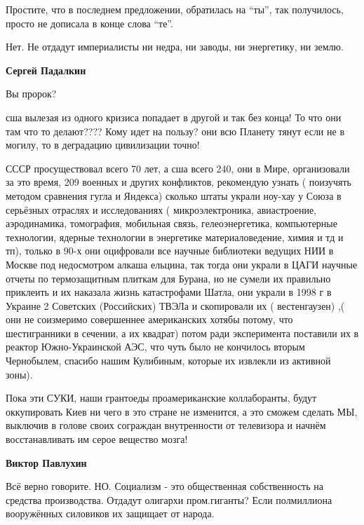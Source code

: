 \begin{itemize}
\begin{itemize}

Простите, что в последнем предложении, обратилась на \enquote{ты}, так
получилось, просто не дописала в конце слова \enquote{те}.

\end{itemize} %

Нет. Не отдадут империалисты ни недра, ни заводы, ни энергетику, ни землю.

\begin{itemize} %
\textbf{Сергей Падалкин} 

Вы пророк?

сша вылезая из одного кризиса попадает в другой и так без конца! То что они там
что то делают???? Кому идет на пользу? они всю Планету тянут если не в могилу,
то в деградацию цивилизации точно!

СССР просуществовал всего 70 лет, а сша всего 240, они в Мире, организовали за
это время, 209 военных и других конфликтов, рекомендую узнать ( поизучять
методом сравнения гугла и Яндекса) сколько штаты украли ноу-хау у Союза в
серьёзных отраслях и исследованиях ( микроэлектроника, авиастроение,
аэродинамика, томография, мобильная связь, гелеоэнергетика, компьютерные
технологии, ядерные технологии в энергетике материаловедение, химия и тд и тп),
только в 90-х они оцифровали все научные библиотеки ведущих НИИ в Москве под
недосмотром алкаша ельцина, так тогда они украли в ЦАГИ научные отчеты по
термозащитным плиткам для Бурана, но не сумели их правильно приклеить и их
наказала жизнь катастрофами Шатла, они украли в 1998 г в Украине 2 Советских
(Российских) ТВЭЛа и скопировали их ( вестенгаузен) ,( они не соизмеримо
совершеннее американских хотябы потому, что шестигранники в сечении, а их
квадрат) потом ради эксперимента поставили их в реактор Южно-Украинской АЭС,
что чуть было не кончилось вторым Чернобылем, спасибо нашим Кулибиным, которые
их извлекли из активной зоны).

Пока эти СУКИ, наши грантоеды проамериканские коллаборанты, будут оккупировать
Киев ни чего в это стране не изменится, а это сможем сделать МЫ, выключив в
голове своих сограждан внутренности от телевизора и начнём восстанавливать им
серое вещество мозга!

\textbf{Виктор Павлухин} 

Всё верно говорите. НО. Социализм - это общественная собственность на средства
производства. Отдадут олигархи пром.гиганты? Если полмиллиона вооружённых
силовиков их защищает от народа.


\end{itemize}
\end{itemize}
